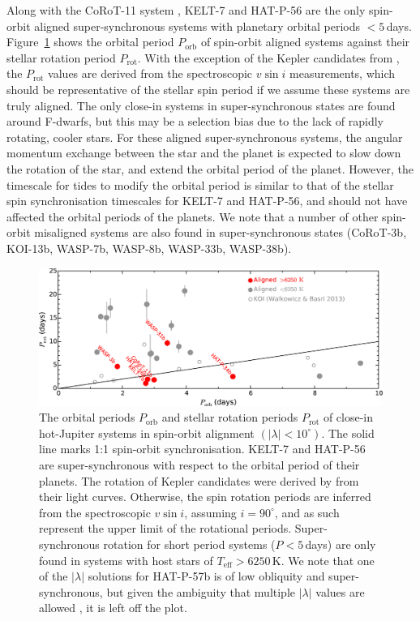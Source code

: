 \documentclass[useAMS,usenatbib]{mn2e}
\begin{document}
Along with the CoRoT-11 system \citep{2010A&amp;A...524A..55G,2012A&amp;A...543L...5G}, KELT-7 and HAT-P-56 are the only spin-orbit aligned super-synchronous systems with planetary orbital periods $<5$\,days. Figure~\ref{fig:porb_prot} shows the orbital period $P_\text{orb}$ of spin-orbit aligned systems against their stellar rotation period $P_\text{rot}$. With the exception of the Kepler candidates from \citet{2013MNRAS.436.1883W}, the $P_\text{rot}$ values are derived from the spectroscopic $v\sin i$ measurements, which should be representative of the stellar spin period if we assume these systems are truly aligned. The only close-in systems in super-synchronous states are found around F-dwarfs, but this may be a selection bias due to the lack of rapidly rotating, cooler stars. For these aligned super-synchronous systems, the angular momentum exchange between the star and the planet is expected to slow down the rotation of the star, and extend the orbital period of the planet. However, the timescale for tides to modify the orbital period is similar to that of the stellar spin synchronisation timescales \citep{2012ApJ...757....6H} for KELT-7 and HAT-P-56, and should not have affected the orbital periods of the planets. We note that a number of other spin-orbit misaligned systems are also found in super-synchronous states (CoRoT-3b, KOI-13b, WASP-7b, WASP-8b, WASP-33b, WASP-38b). 

\begin{figure}
  \includegraphics[width=14cm]{plots/Porb_Prot.eps}
  \caption{\label{fig:porb_prot}The orbital periods $P_\text{orb}$ and stellar rotation periods $P_\text{rot}$ of close-in hot-Jupiter systems in spin-orbit alignment $(|\lambda| < 10^\circ)$. The solid line marks 1:1 spin-orbit synchronisation. KELT-7 and HAT-P-56 are super-synchronous with respect to the orbital period of their planets. The rotation of Kepler candidates were derived by \citet{2013MNRAS.436.1883W} from their light curves. Otherwise, the spin rotation periods are inferred from the spectroscopic $v\sin i$, assuming $i=90^\circ$, and as such represent the upper limit of the rotational periods. Super-synchronous rotation for short period systems ($P<5$\,days) are only found in systems with host stars of $T_\text{eff}>6250\,\text{K}$. We note that one of the $|\lambda|$ solutions for HAT-P-57b is of low obliquity and super-synchronous, but given the ambiguity that multiple $|\lambda|$ values are allowed \citep{2015AJ....150..197H}, it is left off the plot.}
\end{figure}
\end{document}
